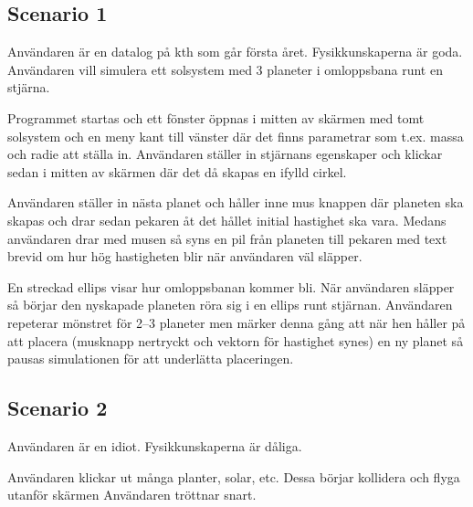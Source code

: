 
\subsection{Scenario 1}

Användaren är en datalog på kth som går första året.
Fysikkunskaperna är goda.
Användaren vill simulera ett solsystem med 3 planeter
i omloppsbana runt en stjärna.

Programmet startas och ett fönster öppnas i mitten av skärmen
med tomt solsystem och en meny kant till vänster där det finns
parametrar som t.ex. massa och radie att ställa in.
Användaren ställer in stjärnans egenskaper och klickar
sedan i mitten av skärmen där det då skapas en ifylld cirkel.

Användaren ställer in nästa planet och håller inne mus knappen där
planeten ska skapas och drar sedan pekaren åt det hållet initial
hastighet ska vara.
Medans användaren drar med musen så syns en pil från planeten till
pekaren med text brevid om hur hög hastigheten blir när användaren väl släpper.

En streckad ellips visar hur omloppsbanan kommer bli.
När användaren släpper så börjar den nyskapade planeten röra sig
i en ellips runt stjärnan.
Användaren repeterar mönstret för 2--3 planeter men märker denna gång
att när hen håller på att placera (musknapp nertryckt och vektorn
för hastighet synes) en ny planet så pausas simulationen för att
underlätta placeringen.

\subsection{Scenario 2}

Användaren är en idiot.
Fysikkunskaperna är dåliga. %

Användaren klickar ut många planter, solar, etc.
Dessa börjar kollidera och flyga utanför skärmen %
Användaren tröttnar snart. %

